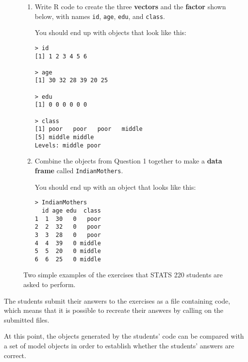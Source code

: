 \begin{figure*}
\begin{boxedminipage}{\linewidth}
\begin{minipage}[t]{.45\linewidth}
\begin{enumerate}
\item 
Write R code to create the three
{\bfseries vectors} and the {\bfseries factor}
shown below, with names {\tt id}, {\tt age},
{\tt edu}, and {\tt class}.

You should end up with objects that look like this:

\begin{verbatim}
> id
[1] 1 2 3 4 5 6

> age
[1] 30 32 28 39 20 25

> edu
[1] 0 0 0 0 0 0

> class
[1] poor   poor   poor   middle 
[5] middle middle
Levels: middle poor
\end{verbatim}
\end{enumerate}
\end{minipage}\hfill%
\begin{minipage}[t]{.45\linewidth}
\begin{enumerate}
\setcounter{enumi}{1}
\item 
Combine the objects from Question 1 together to make a {\bfseries data
frame} called {\tt IndianMothers}.

You should end up with an object that looks like this:

\begin{verbatim}
> IndianMothers
  id age edu  class
1  1  30   0   poor
2  2  32   0   poor
3  3  28   0   poor
4  4  39   0 middle
5  5  20   0 middle
6  6  25   0 middle
\end{verbatim}
\end{enumerate}
\end{minipage}\hspace*{\fill}
\end{boxedminipage}
\caption{\label{figure:lab}Two simple examples of the exercises
that STATS 220 students are asked to perform.}
\end{figure*}

The students submit their answers to the exercises
as a file containing \R{} code, which means that it is possible to
recreate their answers by calling  on the
submitted files.

At this point, the \R{} objects generated by the students' code can be compared
with a set of model \R{} objects in order to establish whether
the students' answers are correct.  

